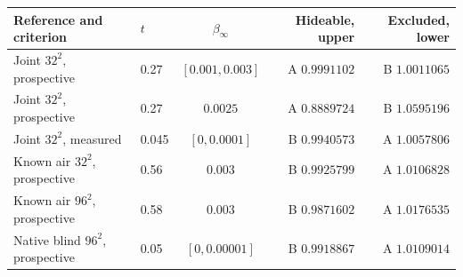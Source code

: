 \begin{tabular}{llcrr}
\toprule
Reference and criterion & \(t\) & \(\beta_\infty\) &
Hideable, upper & Excluded, lower \\
\midrule
Joint \(32^2\), prospective & 0.27 & \([0.001,0.003]\) & A \(0.9991102\) & B \(1.0011065\) \\
Joint \(32^2\), prospective & 0.27 & \(0.0025\) & A \(0.8889724\) & B \(1.0595196\) \\
Joint \(32^2\), measured & 0.045 & \([0,0.0001]\) & B \(0.9940573\) & A \(1.0057806\) \\
Known air \(32^2\), prospective & 0.56 & \(0.003\) & B \(0.9925799\) & A \(1.0106828\) \\
Known air \(96^2\), prospective & 0.58 & \(0.003\) & B \(0.9871602\) & A \(1.0176535\) \\
Native blind \(96^2\), prospective & 0.05 & \([0,0.00001]\) & B \(0.9918867\) & A \(1.0109014\) \\
\bottomrule
\end{tabular}
